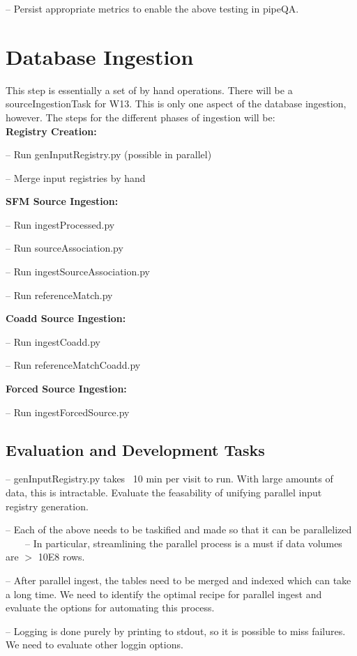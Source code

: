 \documentclass[12pt]{article}
\begin{document}
-- Persist appropriate metrics to enable the above testing in pipeQA.


\clearpage 
\section{Database Ingestion} 
This step is essentially a set of by hand operations.  
There will be a sourceIngestionTask for W13.  This is only one aspect of the
database ingestion, however.  The steps for the different phases of ingestion will be:\\
{\bf Registry Creation:}

-- Run genInputRegistry.py (possible in parallel)

-- Merge input registries by hand

{\bf SFM Source Ingestion:}

-- Run ingestProcessed.py

-- Run sourceAssociation.py

-- Run ingestSourceAssociation.py

-- Run referenceMatch.py

{\bf Coadd Source Ingestion:}

-- Run ingestCoadd.py

-- Run referenceMatchCoadd.py

{\bf Forced Source Ingestion:}

-- Run ingestForcedSource.py

\subsection{Evaluation and Development Tasks}
-- genInputRegistry.py takes ~10 min per visit to run.  With large amounts of data, this is intractable.  Evaluate the feasability of unifying parallel input registry generation.

-- Each of the above needs to be taskified and made so that it can be parallelized
~~~~-- In particular, streamlining the parallel process is a must if data volumes are $>$ 10E8 rows.

-- After parallel ingest, the tables need to be merged and indexed which can take a long time.  We need to identify the optimal recipe for parallel ingest and evaluate the options for automating this process.

-- Logging is done purely by printing to stdout, so it is possible to miss failures.  We need to evaluate other loggin options.
\end{document}
